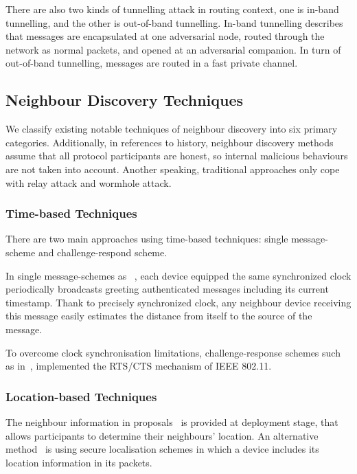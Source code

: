 There are also two kinds of tunnelling attack in routing context, one is in-band tunnelling, and the other is out-of-band tunnelling. In-band tunnelling describes that messages are encapsulated at one adversarial node, routed through the network as normal packets, and opened at an adversarial companion. In turn of out-of-band tunnelling, messages are routed in a fast private channel.

\subsection{Neighbour Discovery Techniques}

We classify existing notable techniques of neighbour discovery into six primary categories. Additionally, in references to history, neighbour discovery methods assume that all protocol participants are honest, so internal malicious behaviours are not taken into account. Another speaking, traditional approaches only cope with relay attack and wormhole attack. 

\subsubsection*{Time-based Techniques}

There are two main approaches using time-based techniques: single message-scheme and challenge-respond scheme. 

In single message-schemes as ~\cite{Brands:1994aa,Hancke:2005:RDB:1128018.1128472,Capkun:2003:SST:986858.986862,Yih-ChunHu2002}, each device equipped the same synchronized clock periodically broadcasts greeting authenticated messages including its current timestamp. Thank to precisely synchronized clock, any neighbour device receiving this message easily estimates the distance from itself to the source of the message. 

To overcome clock synchronisation limitations, challenge-response schemes such as in~\cite{4110280},\cite{FaridNait-Abdesselam2008} implemented the RTS/CTS mechanism of IEEE 802.11. 

\subsubsection*{Location-based Techniques}

The neighbour information in proposals~\cite{Yih-ChunHu2002,LOUKASLAZOS,LoukasLazos2005, 4146955} is provided at deployment stage, that allows participants to determine their neighbours' location. An alternative method~\cite{1589106} is using secure localisation schemes in which a device includes its location information in its packets. 

